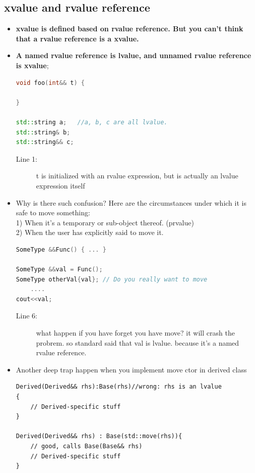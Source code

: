 \documentclass[a4paper,11pt,twoside]{book}
\begin{document}
\subsection{xvalue and rvalue reference}

\begin{itemize}
	\item \textbf{xvalue is defined based on rvalue reference. But you can't think that a rvalue reference is a xvalue. }
	
	\item \textbf{A named rvalue reference is lvalue, and unnamed rvalue reference is xvalue};
	
\begin{lstlisting}[frame=single, language=c++,mathescape=true]
void foo(int&& t) {

}
	
std::string a;   //a, b, c are all lvalue.
std::string& b;
std::string&& c;
\end{lstlisting}
\begin{description}
	\item[Line 1:] t is initialized with an rvalue expression, but is actually an lvalue expression itself
\end{description}
	

	\item Why is there such confusion? Here are the circumstances under which it is safe to move something:\\
	1) When it's a temporary or sub-object thereof. (prvalue) \\
	2) When the user has explicitly said to move it.
\begin{lstlisting}[frame=single, language=c++]
SomeType &&Func() { ... }
	
SomeType &&val = Func();
SomeType otherVal{val}; // Do you really want to move 
	....
cout<<val; 
\end{lstlisting}
\begin{description}
	\item[Line 6:] what happen if you have forget you have move? it will crash the probrem. so standard said that val is lvalue. because it's a named rvalue reference.
\end{description}
	
\item Another deep trap happen when you implement move ctor in derived class
\begin{lstlisting}[numbers=none]
Derived(Derived&& rhs):Base(rhs)//wrong: rhs is an lvalue
{
	// Derived-specific stuff
}
	
Derived(Derived&& rhs) : Base(std::move(rhs)){
	// good, calls Base(Base&& rhs)
	// Derived-specific stuff
}
\end{lstlisting}
	
\end{itemize}
\end{document}
